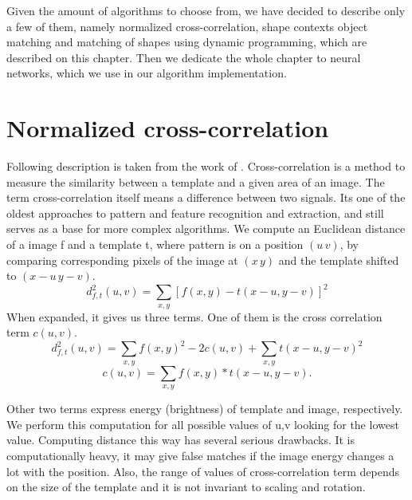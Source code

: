 Given the amount of algorithms to choose from, we have decided to describe only a few of them, namely normalized cross-correlation, shape contexts object matching and matching of shapes using dynamic programming, which are described on this chapter. Then we dedicate the whole chapter to neural networks, which we use in our algorithm implementation.

\section{Normalized cross-correlation}
Following description is taken from the work of \cite{crossCorrLewis}.
Cross-correlation is a method to measure the similarity between a template and a given area of an image. The term cross-correlation itself means a difference between two signals. Its one of the oldest approaches to pattern and feature recognition and extraction, and still serves as a base for more complex algorithms.
We compute an Euclidean distance of a image f and a template t, where pattern is on a position $(u\,v)$, by comparing corresponding pixels of the image at $(x\,y)$ and the template shifted to $(x-u\,y-v)$. 
\begin{equation*}
d_{f,t}^{2}(u,v)=\sum_{x,y} [ f(x,y) - t(x-u, y-v) ]^{2} 
\end{equation*}
When expanded, it gives us three terms. One of them is the cross correlation term $c(u,v)$.
\begin{equation*}
d_{f,t}^{2}(u,v)=\sum_{x,y} f(x,y)^{2} - 2c(u,v) + \sum_{x,y} t(x-u, y-v)^2
\end{equation*}
\begin{equation*}
c(u,v)=\sum_{x,y} f(x,y) * t(x-u, y-v).
\end{equation*}

Other two terms express energy (brightness) of template and image, respectively. We perform this computation for all possible values of u,v looking for the lowest value. Computing distance this way has several serious drawbacks. It is computationally heavy, it may give false matches if the image energy changes a lot with the position. Also, the range of values of cross-correlation term depends on the size of the template and it is not invariant to scaling and rotation. 

